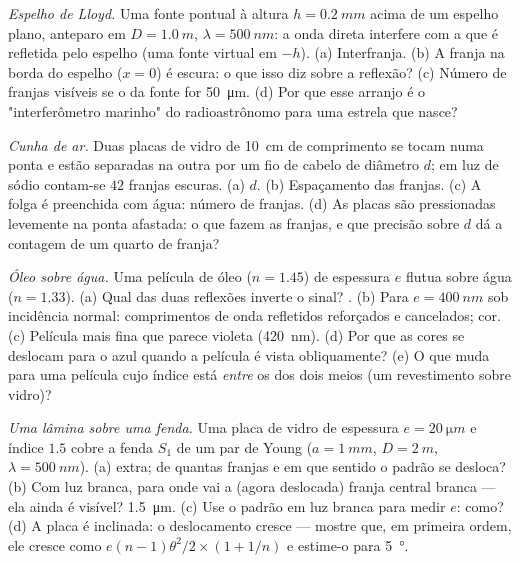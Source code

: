 \begin{exercise}[$\star\star$]\label{exo:b2:two-wave-interference:7}
\emph{Espelho de Lloyd.} Uma fonte pontual à altura $h = \qty{0.2}{mm}$ acima de um
espelho plano, anteparo em $D = \qty{1.0}{m}$, $\lambda = \qty{500}{nm}$: a onda direta
interfere com a que é refletida pelo espelho (uma fonte virtual em
$-h$). (a) Interfranja. (b) A franja na borda do espelho ($x = 0$) é
escura: o que isso diz sobre a reflexão? (c) Número de franjas
visíveis se o  da fonte for \qty{50}{\micro m}. (d) Por que
esse arranjo é o "interferômetro marinho" do radioastrônomo para uma
estrela que nasce?
\end{exercise}

\begin{exercise}[$\star\star$]\label{exo:b2:two-wave-interference:8}
\emph{Cunha de ar.} Duas placas de vidro de \qty{10}{cm} de comprimento se tocam numa ponta e
estão separadas na outra por um fio de cabelo de diâmetro $d$; em luz de sódio
contam-se $42$ franjas escuras. (a) $d$. (b) Espaçamento das franjas. (c) A folga
é preenchida com água: número de franjas. (d) As placas são pressionadas
levemente na ponta afastada: o que fazem as franjas, e que precisão sobre
$d$ dá a contagem de um quarto de franja?
\end{exercise}

\begin{exercise}[$\star\star$]\label{exo:b2:two-wave-interference:9}
\emph{Óleo sobre água.} Uma película de óleo ($n = 1.45$) de espessura $e$ flutua
sobre água ($n = 1.33$). (a) Qual das duas reflexões inverte o
sinal? . (b) Para $e = \qty{400}{nm}$ sob incidência normal:
comprimentos de onda refletidos reforçados e cancelados; cor. (c) Película mais fina
que parece violeta (\qty{420}{nm}). (d) Por que as cores se deslocam para
o azul quando a película é vista obliquamente? (e) O que muda para uma película
cujo índice está \emph{entre} os dos dois meios (um revestimento sobre
vidro)?
\end{exercise}

\begin{exercise}[$\star\star\star$]\label{exo:b2:two-wave-interference:10}
\emph{Uma lâmina sobre uma fenda.} Uma placa de vidro de espessura $e = \qty{20}{\micro m}$
e índice $1.5$ cobre a fenda $S_1$ de um par de Young ($a = \qty{1}{mm}$, $D =
\qty{2}{m}$, $\lambda = \qty{500}{nm}$). (a)  extra; de quantas franjas
e em que sentido o padrão se desloca? (b) Com luz branca,
para onde vai a (agora deslocada) franja central branca --- ela ainda é
visível?  \qty{1.5}{\micro m}. (c) Use o padrão em luz
branca para medir $e$: como? (d) A placa é inclinada: o deslocamento cresce
--- mostre que, em primeira ordem, ele cresce como $e(n - 1)\theta^2/2 \times (1 + 1/n)$
e estime-o para \qty{5}{\degree}.
\end{exercise}

